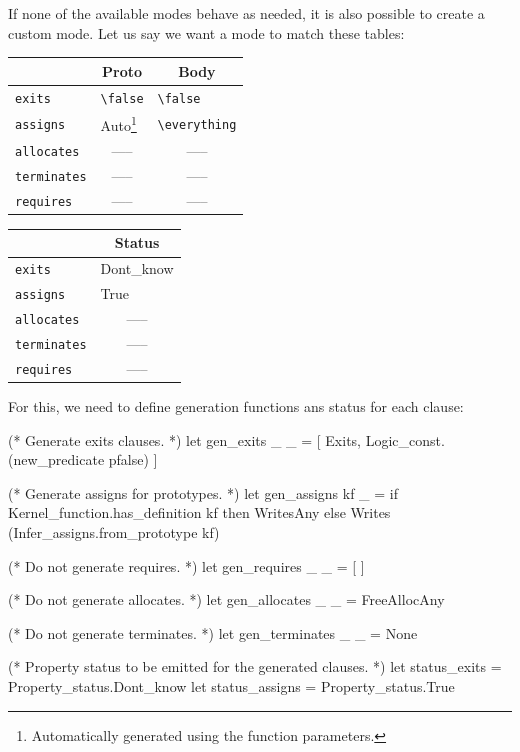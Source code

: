 If none of the available modes behave as needed, it is also possible to create a
custom mode. Let us say we want a mode to match these tables:
\begin{table}[h]
  \centering
  \begin{minipage}{.5\linewidth}
    \begin{tabular}{@{}l|ll@{}}
      ~ & \multicolumn{1}{c}{Proto} & \multicolumn{1}{c}{Body}  \\ \midrule
      \texttt{exits}        & \verb+\false+  & \verb+\false+ \\
      \texttt{assigns}      & Auto\footnote{Automatically generated using the function parameters.} & \verb+\everything+ \\
      \texttt{allocates}    & \multicolumn{1}{c}{-----} & \multicolumn{1}{c}{-----} \\
      \texttt{terminates}   & \multicolumn{1}{c}{-----} & \multicolumn{1}{c}{-----} \\
      \texttt{requires}     & \multicolumn{1}{c}{-----} & \multicolumn{1}{c}{-----} \\
    \end{tabular}
  \end{minipage}
  \begin{minipage}{.4\linewidth}
      \begin{tabular}{@{}l|l@{}}
        \footnotetext{} %
        ~ & \multicolumn{1}{c}{Status} \\ \midrule
        \texttt{exits}      & Dont\_know \\
        \texttt{assigns}    & True \\
        \texttt{allocates}  & \multicolumn{1}{c}{-----} \\
        \texttt{terminates} & \multicolumn{1}{c}{-----} \\
        \texttt{requires}   & \multicolumn{1}{c}{-----} \\
    \end{tabular}
  \end{minipage}
\end{table}


For this, we need to define generation functions ans status for each clause:

\begin{ocamlcode}
(* Generate exits \false clauses. *)
let gen_exits _ _ =
  [ Exits, Logic_const.(new_predicate pfalse) ]

(* Generate assigns for prototypes. *)
let gen_assigns kf _ =
  if Kernel_function.has_definition kf then
    WritesAny
  else Writes (Infer_assigns.from_prototype kf)

(* Do not generate requires. *)
let gen_requires _ _ = [ ]

(* Do not generate allocates. *)
let gen_allocates _ _ = FreeAllocAny

(* Do not generate terminates. *)
let gen_terminates _ _ = None

(* Property status to be emitted for the generated clauses. *)
let status_exits = Property_status.Dont_know
let status_assigns = Property_status.True
\end{ocamlcode}


